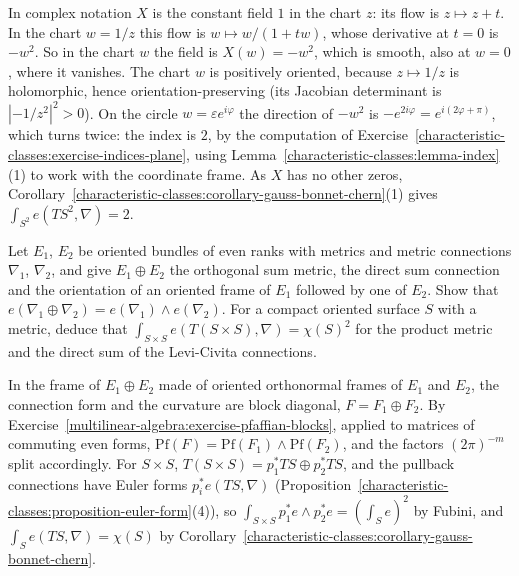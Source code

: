 \begin{solution}
In complex notation $X$ is the constant field $1$ in the chart $z$: its flow is $z \mapsto z + t$. In the chart $w = 1/z$ this flow is $w \mapsto w/(1 + tw)$, whose derivative at $t = 0$ is
$-w^2$. So in the chart $w$ the field is $X(w) = -w^2$, which is smooth, also at $w = 0$, where it vanishes. The chart $w$ is positively oriented, because $z \mapsto 1/z$ is holomorphic, hence
orientation-preserving (its Jacobian determinant is $|{-1/z^2}|^2 > 0$). On the circle $w = \varepsilon e^{i\varphi}$ the direction of $-w^2$ is $-e^{2i\varphi} = e^{i(2\varphi + \pi)}$, which turns twice: the
index is $2$, by the computation of Exercise~\ref{characteristic-classes:exercise-indices-plane}, using Lemma~\ref{characteristic-classes:lemma-index}(1) to work with the coordinate frame. As $X$ has no
other zeros, Corollary~\ref{characteristic-classes:corollary-gauss-bonnet-chern}(1) gives $\int_{S^2}e(TS^2, \nabla) = 2$.
\end{solution}

\begin{exercise}\label{characteristic-classes:exercise-euler-form-sum}
Let $E_1$, $E_2$ be oriented bundles of even ranks with metrics and metric connections $\nabla_1$, $\nabla_2$, and give $E_1 \oplus E_2$ the orthogonal sum metric, the direct sum connection
and the orientation of an oriented frame of $E_1$ followed by one of $E_2$. Show that $e(\nabla_1 \oplus \nabla_2) = e(\nabla_1) \wedge e(\nabla_2)$. For a compact oriented surface $S$ with a metric,
deduce that $\int_{S \times S}e(T(S \times S), \nabla) = \chi(S)^2$ for the product metric and the direct sum of the Levi-Civita connections.
\end{exercise}

\begin{solution}
In the frame of $E_1 \oplus E_2$ made of oriented orthonormal frames of $E_1$ and $E_2$, the connection form and the curvature are block diagonal, $F = F_1 \oplus F_2$. By
Exercise~\ref{multilinear-algebra:exercise-pfaffian-blocks}, applied to matrices of commuting even forms, $\mathrm{Pf}(F) = \mathrm{Pf}(F_1) \wedge \mathrm{Pf}(F_2)$, and the factors $(2\pi)^{-m}$
split accordingly. For $S \times S$, $T(S \times S) = p_1^*TS \oplus p_2^*TS$, and the pullback connections have Euler forms $p_i^*e(TS, \nabla)$ (Proposition~\ref{characteristic-classes:proposition-euler-form}(4)), so
$\int_{S \times S}p_1^*e \wedge p_2^*e = (\int_Se)^2$ by Fubini, and $\int_Se(TS, \nabla) = \chi(S)$ by Corollary~\ref{characteristic-classes:corollary-gauss-bonnet-chern}.
\end{solution}
